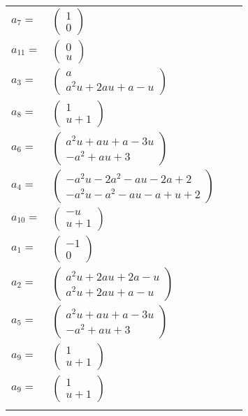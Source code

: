 \documentclass[1p]{elsarticle_modified}
\theoremstyle{definition}
\begin{document}
\begin{tabular}{m{7pt} m{180pt} m{7pt} m{180pt} }
\flushright $a_{7}=$&$\begin{pmatrix}1\\0\end{pmatrix}$ \\
\flushright $a_{11}=$&$\begin{pmatrix}0\\u\end{pmatrix}$ \\
\flushright $a_{3}=$&$\begin{pmatrix}a\\a^2 u+2 a u+a- u\end{pmatrix}$ \\
\flushright $a_{8}=$&$\begin{pmatrix}1\\u+1\end{pmatrix}$ \\
\flushright $a_{6}=$&$\begin{pmatrix}a^2 u+a u+a-3 u\\- a^2+a u+3\end{pmatrix}$ \\
\flushright $a_{4}=$&$\begin{pmatrix}- a^2 u-2 a^2- a u-2 a+2\\- a^2 u- a^2- a u- a+u+2\end{pmatrix}$ \\
\flushright $a_{10}=$&$\begin{pmatrix}- u\\u+1\end{pmatrix}$ \\
\flushright $a_{1}=$&$\begin{pmatrix}-1\\0\end{pmatrix}$ \\
\flushright $a_{2}=$&$\begin{pmatrix}a^2 u+2 a u+2 a- u\\a^2 u+2 a u+a- u\end{pmatrix}$ \\
\flushright $a_{5}=$&$\begin{pmatrix}a^2 u+a u+a-3 u\\- a^2+a u+3\end{pmatrix}$ \\
\flushright $a_{9}=$&$\begin{pmatrix}1\\u+1\end{pmatrix}$\\ \flushright $a_{9}=$&$\begin{pmatrix}1\\u+1\end{pmatrix}$\\&\end{tabular}
\end{document}
